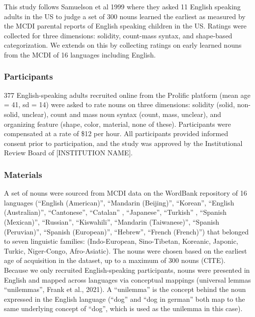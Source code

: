 \documentclass[
  american,
  man,floatsintext]{apa6}
\begin{document}
This study follows Samuelson et al 1999 where they asked 11 English speaking adults in the US to judge a set of 300 nouns learned the earliest as measured by the MCDI parental reports of English speaking children in the US. Ratings were collected for three dimensions: solidity, count-mass syntax, and shape-based categorization.
We extends on this by collecting ratings on early learned nouns from the MCDI of 16 languages including English.

\subsubsection{Participants}\label{participants}

377 English-speaking adults recruited online from the Prolific platform (mean age = 41, sd = 14) were asked to rate nouns on three dimensions: solidity (solid, non-solid, unclear), count and mass noun syntax (count, mass, unclear), and organizing feature (shape, color, material, none of these). Participants were compensated at a rate of \$12 per hour. All participants provided informed consent prior to participation, and the study was approved by the Institutional Review Board of {[}INSTITUTION NAME{]}.

\subsubsection{Materials}\label{materials}

A set of nouns were sourced from MCDI data on the WordBank repository of 16 languages (``English (American)'', ``Mandarin (Beijing)'', ``Korean'', ``English (Australian)'', ``Cantonese'', ``Catalan'' , ``Japanese'', ``Turkish'' , ``Spanish (Mexican)'', ``Russian'', ``Kiswahili'', ``Mandarin (Taiwanese)'', ``Spanish (Peruvian)'', ``Spanish (European)'', ``Hebrew'', ``French (French)'') that belonged to seven linguistic families: (Indo-European, Sino-Tibetan, Koreanic, Japonic, Turkic, Niger-Congo, Afro-Asiatic).
The nouns were chosen based on the earliest age of acquisition in the dataset, up to a maximum of 300 nouns (CITE). Because we only recruited English-speaking participants, nouns were presented in English and mapped across languages via conceptual mappings (universal lemmas ``unilemmas'', Frank et al., 2021). A ``unilemma'' is the concept behind the noun expressed in the English language (``dog'' and ``dog in german'' both map to the same underlying concept of ``dog'', which is used as the unilemma in this case).
\end{document}
